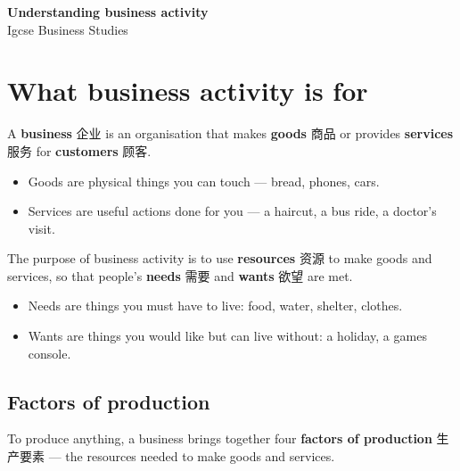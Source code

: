 \documentclass[11pt]{article}
\begin{document}
\begin{center}
  {\LARGE\bfseries Understanding business activity}\\[0.35em]
  {\large Igcse Business Studies}
\end{center}
\vspace{0.6em}

\section*{What business activity is for}

A \textbf{business} 企业 is an organisation that makes \textbf{goods} 商品 or provides \textbf{services} 服务 for \textbf{customers} 顾客.

\begin{itemize}
\item Goods are physical things you can touch — bread, phones, cars.

\item Services are useful actions done for you — a haircut, a bus ride, a doctor's visit.

\end{itemize}

The purpose of business activity is to use \textbf{resources} 资源 to make goods and services, so that people's \textbf{needs} 需要 and \textbf{wants} 欲望 are met.

\begin{itemize}
\item Needs are things you must have to live: food, water, shelter, clothes.

\item Wants are things you would like but can live without: a holiday, a games console.

\end{itemize}

\subsection*{Factors of production}

To produce anything, a business brings together four \textbf{factors of production} 生产要素 — the resources needed to make goods and services.

\begin{center}
\end{center}
\end{document}

